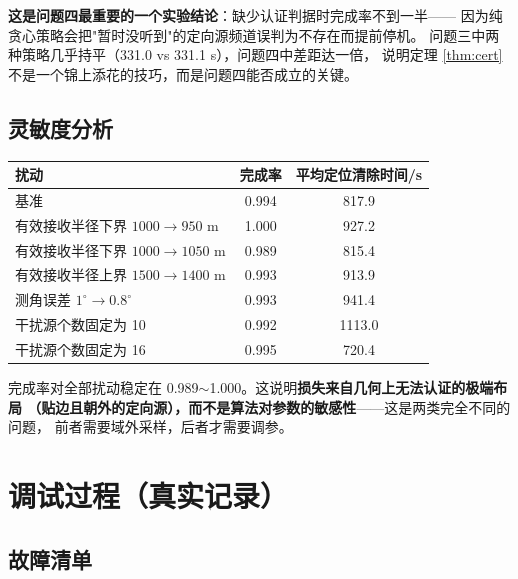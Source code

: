 \textbf{这是问题四最重要的一个实验结论}：缺少认证判据时完成率不到一半——
因为纯贪心策略会把"暂时没听到"的定向源频道误判为不存在而提前停机。
问题三中两种策略几乎持平（331.0 vs 331.1 s），问题四中差距达一倍，
说明定理 \ref{thm:cert} 不是一个锦上添花的技巧，而是问题四能否成立的关键。

\subsection{灵敏度分析}

\begin{center}
\begin{tabular}{lcc}
\toprule
扰动 & 完成率 & 平均定位清除时间/s \\ \midrule
基准 & 0.994 & 817.9 \\
有效接收半径下界 $1000\to950$ m & 1.000 & 927.2 \\
有效接收半径下界 $1000\to1050$ m & 0.989 & 815.4 \\
有效接收半径上界 $1500\to1400$ m & 0.993 & 913.9 \\
测角误差 $1^{\circ}\to0.8^{\circ}$ & 0.993 & 941.4 \\
干扰源个数固定为 10 & 0.992 & 1113.0 \\
干扰源个数固定为 16 & 0.995 & 720.4 \\
\bottomrule
\end{tabular}
\end{center}

完成率对全部扰动稳定在 0.989$\sim$1.000。这说明\textbf{损失来自几何上无法认证的极端布局
（贴边且朝外的定向源），而不是算法对参数的敏感性}——这是两类完全不同的问题，
前者需要域外采样，后者才需要调参。

\section{调试过程（真实记录）}

\subsection{故障清单}

